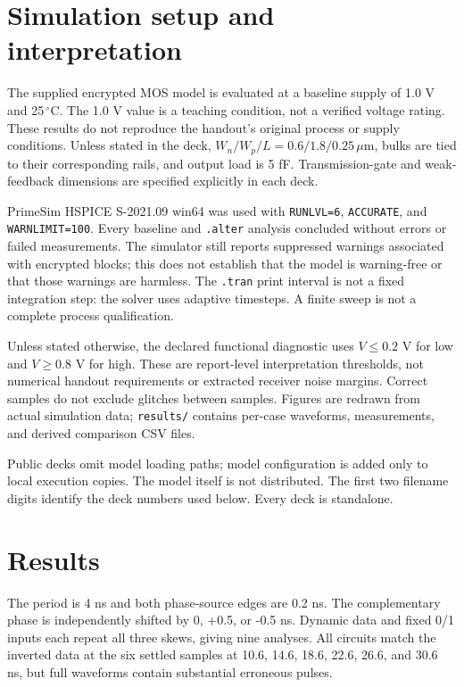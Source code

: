\section{Simulation setup and interpretation}

The supplied encrypted MOS model is evaluated at a baseline supply of 1.0 V and 25\,$^\circ$C. The 1.0 V value is a teaching condition, not a verified voltage rating. These results do not reproduce the handout's original process or supply conditions. Unless stated in the deck, $W_n/W_p/L=0.6/1.8/0.25\,\mu\mathrm m$, bulks are tied to their corresponding rails, and output load is 5 fF. Transmission-gate and weak-feedback dimensions are specified explicitly in each deck.

PrimeSim HSPICE S-2021.09 win64 was used with \texttt{RUNLVL=6}, \texttt{ACCURATE}, and \texttt{WARNLIMIT=100}. Every baseline and \texttt{.alter} analysis concluded without errors or failed measurements. The simulator still reports suppressed warnings associated with encrypted blocks; this does not establish that the model is warning-free or that those warnings are harmless. The \texttt{.tran} print interval is not a fixed integration step: the solver uses adaptive timesteps. A finite sweep is not a complete process qualification.

Unless stated otherwise, the declared functional diagnostic uses $V\leq0.2$ V for low and $V\geq0.8$ V for high. These are report-level interpretation thresholds, not numerical handout requirements or extracted receiver noise margins. Correct samples do not exclude glitches between samples. Figures are redrawn from actual simulation data; \texttt{results/} contains per-case waveforms, measurements, and derived comparison CSV files.

Public decks omit model loading paths; model configuration is added only to local execution copies. The model itself is not distributed. The first two filename digits identify the deck numbers used below. Every deck is standalone.

\section{Results}

The period is 4 ns and both phase-source edges are 0.2 ns. The complementary phase is independently shifted by 0, +0.5, or -0.5 ns. Dynamic data and fixed 0/1 inputs each repeat all three skews, giving nine analyses. All circuits match the inverted data at the six settled samples at 10.6, 14.6, 18.6, 22.6, 26.6, and 30.6 ns, but full waveforms contain substantial erroneous pulses.

